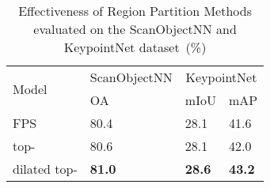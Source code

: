 \documentclass[journal]{IEEEtran}
\begin{document}
\begin{comment}
\begin{table}[tb]
\small
\centering
\caption{Effectiveness of different region partition methods used in IRL module evaluated on the ScanObjectNN Dataset~(\%)}
\begin{tabular}{|*{1}{p{4.0cm}<{\centering}}|*{1}{p{3.6cm}<{\centering}}|}
\hline
region partition & OA\\
\hline
\hline
FPS &  80.4\\
top- & 80.6\\
dilated top- & \textbf{81.0}\\
\hline
\end{tabular}
\label{table:effectiveness_of_different_region_partition}
\end{table}
\end{comment}

\begin{table}[tb]
\small
\centering
\caption{Effectiveness of Region  Partition  Methods evaluated on the ScanObjectNN and KeypointNet dataset~(\%)}
\begin{tabular}{|*{1}{p{2.0cm}<{\centering}}|*{1}{p{2.0cm}<{\centering}}|*{2}{p{1.5cm}<{\centering}}|}
\hline
\multirow{2}{*}{Model}& \multicolumn{1}{c|}{ScanObjectNN} & \multicolumn{2}{c|}{\multirow{1}{*}{KeypointNet}}\\
\cline{2-4}  & OA & mIoU & mAP\\
\hline
\hline
FPS & 80.4 & 28.1 & 41.6\\
top- & 80.6 & 28.1 & 42.0\\
dilated top- & \textbf{81.0} & \textbf{28.6} & \textbf{43.2}\\
\hline
\end{tabular}
\label{table:effectiveness_of_different_region_partition}
\end{table}
\end{document}
